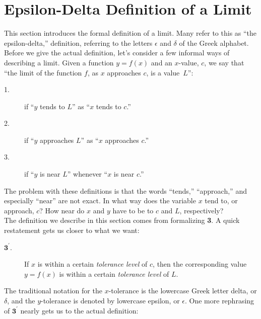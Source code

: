 
\section{Epsilon-Delta Definition of a Limit}\label{sec:limit_def}

This section introduces the formal definition of a limit. Many refer to this as ``the epsilon-delta,'' definition, referring to the letters $\epsilon$ and $\delta$ of the Greek alphabet.%
\\

Before we give the actual definition, let's consider a few informal ways of describing a limit.  Given a function $y=f(x)$ and an $x$-value, $c$, we say that ``the limit of the function $f$, as $x$ approaches $c$, is a value~$L$'': 

\begin{description}
\item[1.]if ``$y$ tends to $L$'' as ``$x$ tends to $c$.''
\item[2.]if ``$y$ approaches $L$'' as ``$x$ approaches $c$.''
\item[3.]if ``$y$ is near $L$'' whenever ``$x$ is near $c$.''
\end{description}

The problem with these definitions is that the words ``tends,'' ``approach,'' and especially ``near'' are not exact.  In what way does the variable $x$ tend to, or approach, $c$? How near do $x$ and $y$ have to be to $c$ and $L$, respectively?  \\

The definition we describe in this section comes from formalizing {\bf 3}.  A quick restatement gets us closer to what we want:

\begin{description}
\item[$\textbf{3}^\prime$.]If $x$ is within a certain \textit{tolerance level} of $c$, then the corresponding value $y=f(x)$ is within a certain \textit{tolerance level} of $L$.
\end{description}

The traditional notation for the $x$-tolerance is the lowercase Greek letter delta, or $\delta$, and the $y$-tolerance is denoted by lowercase epsilon, or $\epsilon$. One more rephrasing of $\textbf{3}^\prime$ nearly gets us to the actual definition:

